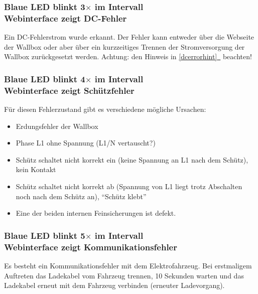 \documentclass[a4paper,10pt]{article}
\newcommand*{\fullref}[1]{\hyperref[{#1}]{\ref*{#1}~\nameref*{#1}}}
\begin{document}
\begin{multicols*}{2}
	\begin{minipage}{\linewidth} %
		\subsubsection*{Blaue LED blinkt 3$\times$ im Intervall \\ Webinterface zeigt DC-Fehler}
		Ein DC-Fehlerstrom wurde erkannt. Der Fehler kann entweder über die Webseite der Wallbox oder aber über
		ein kurzzeitiges Trennen der Stromversorgung der Wallbox zurückgesetzt
		werden. Achtung: den Hinweis in \fullref{dcerrorhint} beachten!
	\end{minipage}

	\subsubsection*{Blaue LED blinkt 4$\times$ im Intervall \\ Webinterface zeigt Schützfehler}
	Für diesen Fehlerzustand gibt es verschiedene mögliche Ursachen:
	\begin{itemize}
		\item Erdungsfehler der Wallbox
		\item Phase L1 ohne Spannung (L1/N vertauscht?)
		\item Schütz schaltet nicht korrekt ein (keine Spannung an L1 nach dem Schütz), kein
		      Kontakt
		\item Schütz schaltet nicht korrekt ab (Spannung von L1 liegt trotz Abschalten noch
		      nach dem Schütz an), \enquote{Schütz klebt}
		\item Eine der beiden internen Feinsicherungen ist defekt.
	\end{itemize}

	\subsubsection*{Blaue LED blinkt 5$\times$ im Intervall \\ Webinterface zeigt Kommunikationsfehler}
	Es besteht ein Kommunikationsfehler mit dem Elektrofahrzeug. Bei erstmaligem
	Auftreten das Ladekabel vom Fahrzeug trennen, 10 Sekunden warten und das
	Ladekabel erneut mit dem Fahrzeug verbinden (erneuter Ladevorgang).


\end{multicols*}
\end{document}
